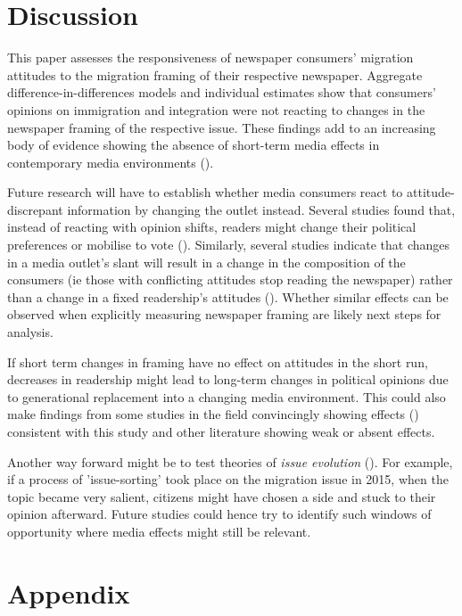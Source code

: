 \documentclass{article}
\begin{document}
\section{Discussion}

This paper assesses the responsiveness of newspaper consumers' migration attitudes to the migration framing of their respective newspaper. Aggregate difference-in-differences models and individual estimates show that consumers' opinions on immigration and integration were not reacting to changes in the newspaper framing of the respective issue. These findings add to an increasing body of evidence showing the absence of short-term media effects in contemporary media environments (\cite{Arceneaux2013, Durante2012, Gentzkow2010, Guess2021, Lau2021}). 

Future research will have to establish whether media consumers react to attitude-discrepant information by changing the outlet instead. Several studies found that, instead of reacting with opinion shifts, readers might change their political preferences or mobilise to vote (\cite{Stetka2020}). Similarly, several studies indicate that changes in a media outlet's slant will result in a change in the composition of the consumers (ie those with conflicting attitudes stop reading the newspaper) rather than a change in a fixed readership's attitudes (\cite{Arceneaux2013, Durante2012, Spirig2020}). Whether similar effects can be observed when explicitly measuring newspaper framing are likely next steps for analysis.

If short term changes in framing have no effect on attitudes in the short run, decreases in readership might lead to long-term changes in political opinions due to generational replacement into a changing media environment. This could also make findings from some studies in the field convincingly showing effects (\cite{Foos2020}) consistent with this study and other literature showing weak or absent effects.

Another way forward might be to test theories of \textit{issue evolution} (\cite{Carmines1986}). For example, if a process of 'issue-sorting' took place on the migration issue in 2015, when the topic became very salient, citizens might have chosen a side and stuck to their opinion afterward. Future studies could hence try to identify such windows of opportunity where media effects might still be relevant.

\printbibliography


\section{Appendix}
\end{document}
